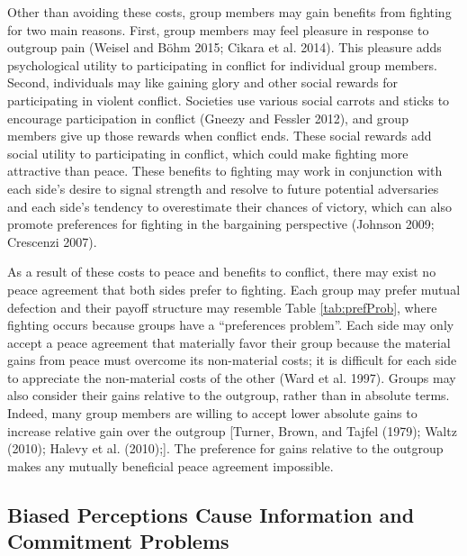 \documentclass[11pt]{article}
\begin{document}
Other than avoiding these costs, group members may gain benefits from
fighting for two main reasons. First, group members may feel pleasure in
response to outgroup pain (Weisel and Böhm 2015; Cikara et al. 2014).
This pleasure adds psychological utility to participating in conflict
for individual group members. Second, individuals may like gaining glory
and other social rewards for participating in violent conflict.
Societies use various social carrots and sticks to encourage
participation in conflict (Gneezy and Fessler 2012), and group members
give up those rewards when conflict ends. These social rewards add
social utility to participating in conflict, which could make fighting
more attractive than peace. These benefits to fighting may work in
conjunction with each side's desire to signal strength and resolve to
future potential adversaries and each side's tendency to overestimate
their chances of victory, which can also promote preferences for
fighting in the bargaining perspective (Johnson 2009; Crescenzi 2007).

As a result of these costs to peace and benefits to conflict, there may
exist no peace agreement that both sides prefer to fighting. Each group
may prefer mutual defection and their payoff structure may resemble
Table \ref{tab:prefProb}, where fighting occurs because groups have a
``preferences problem''. Each side may only accept a peace agreement
that materially favor their group because the material gains from peace
must overcome its non-material costs; it is difficult for each side to
appreciate the non-material costs of the other (Ward et al. 1997).
Groups may also consider their gains relative to the outgroup, rather
than in absolute terms. Indeed, many group members are willing to accept
lower absolute gains to increase relative gain over the outgroup
{[}Turner, Brown, and Tajfel (1979); Waltz (2010); Halevy et al.
(2010);{]}. The preference for gains relative to the outgroup makes any
mutually beneficial peace agreement impossible.

\hypertarget{biased-perceptions-cause-information-and-commitment-problems}{%
\subsection{Biased Perceptions Cause Information and Commitment
Problems}\label{biased-perceptions-cause-information-and-commitment-problems}}
\end{document}

